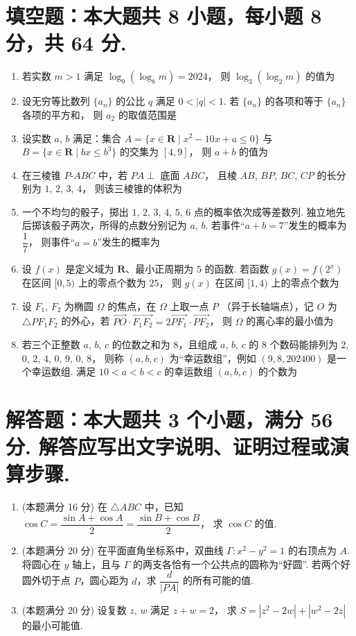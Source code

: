 \documentclass{chsmc}
\begin{document}
\section{填空题：本大题共 8 小题，每小题 8 分，共 64 分.}

\begin{enumerate}
	\item 若实数 $m > 1$ 满足 $\log_9(\log_8 m) = 2024$，
		则 $\log_3(\log_2 m)$ 的值为 \blankline
	\item 设无穷等比数列 $\{a_n\}$ 的公比 $q$ 满足 $0 < |q| < 1$.
		若 $\{a_n\}$ 的各项和等于 $\{a_n\}$ 各项的平方和，
		则 $a_2$ 的取值范围是 \blankline
	\item 设实数 $a$, $b$ 满足：集合
		$A = \{x\in \mathbf{R} \mid x^2 - 10x + a \leqslant 0\}$ 与
		$B = \{x\in \mathbf{R} \mid bx \leqslant b^3\}$ 的交集为 $[4,9]$，
		则 $a+b$ 的值为 \blankline
	\item 在三棱锥 $P\text{-}ABC$ 中，若 $PA \perp$ 底面 $ABC$，
		且棱 $AB$, $BP$, $BC$, $CP$ 的长分别为 $1$, $2$, $3$, $4$，
		则该三棱锥的体积为 \blankline
	\item 一个不均匀的骰子，掷出 $1$, $2$, $3$, $4$, $5$, $6$ 点的概率依次成等差数列.
		独立地先后掷该骰子两次，所得的点数分别记为 $a$, $b$.
		若事件“$a+b=7$”发生的概率为 $\dfrac{1}{7}$，
		则事件“$a=b$”发生的概率为 \blankline
	\item 设 $f(x)$ 是定义域为 $\mathbf{R}$、最小正周期为 $5$ 的函数.
		若函数 $g(x) = f(2^x)$ 在区间 $[0,5)$ 上的零点个数为 $25$，
		则 $g(x)$ 在区间 $[1,4)$ 上的零点个数为 \blankline
	\item 设 $F_1$, $F_2$ 为椭圆 $\Omega$ 的焦点，在 $\Omega$ 上取一点 $P$
		（异于长轴端点），记 $O$ 为 $\triangle PF_1F_2$ 的外心，若
		$\overrightarrow{PO}\cdot\overrightarrow{F_1F_2} =
		2\overrightarrow{PF_1}\cdot\overrightarrow{PF_2}$，
		则 $\Omega$ 的离心率的最小值为 \blankline
	\item 若三个正整数 $a$, $b$, $c$ 的位数之和为 $8$，且组成 $a$, $b$, $c$
		的 $8$ 个数码能排列为 $2$, $0$, $2$, $4$, $0$, $9$, $0$, $8$，
		则称 $(a,b,c)$ 为“幸运数组”，例如 $(9,8,202400)$ 是一个幸运数组.
		满足 $10 < a < b < c$ 的幸运数组 $(a,b,c)$ 的个数为 \blankline
\end{enumerate}

\section{解答题：本大题共 3 个小题，满分 56 分. 解答应写出文字说明、证明过程或演算步骤.}

\begin{enumerate}[resume]
	\item (本题满分 16 分) 在 $\triangle ABC$ 中，已知
		$\cos C = \dfrac{\sin A + \cos A}{2} = \dfrac{\sin B + \cos B}{2}$，
		求 $\cos C$ 的值.
	\item (本题满分 20 分) 在平面直角坐标系中，双曲线
		$\Gamma\colon x^2-y^2=1$ 的右顶点为 $A$.
		将圆心在 $y$ 轴上，且与 $\Gamma$ 的两支各恰有一个公共点的圆称为“好圆”.
		若两个好圆外切于点 $P$，圆心距为 $d$，求 $\dfrac{d}{|PA|}$ 的所有可能的值.
	\item (本题满分 20 分) 设复数 $z$, $w$ 满足 $z+w=2$，
		求 $S = |z^2-2w| + |w^2-2z|$ 的最小可能值.
\end{enumerate}
\end{document}
